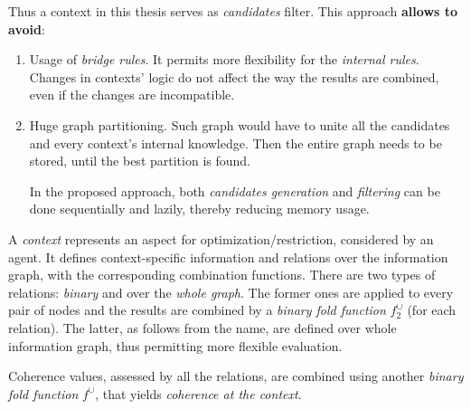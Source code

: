 \documentclass[ThesisDoc]{subfiles}
\begin{document}
Thus a context in this thesis serves as \emph{candidates} filter. This approach
\textbf{allows to avoid}:
\begin{enumerate}
  \item Usage of \emph{bridge rules}. It permits more flexibility for
    the \emph{internal rules}. Changes in contexts' logic do not affect the way
    the results are combined, even if the changes are incompatible.
  \item Huge graph partitioning. Such graph would have to unite all the
    candidates and every context's internal knowledge. Then the entire graph
    needs to be stored, until the best partition is found.

    In the proposed approach, both \emph{candidates generation} and
    \emph{filtering} can be done sequentially and lazily,
    thereby reducing memory usage.

\end{enumerate}

\medskip

\noindent
A \emph{context} represents an aspect for optimization/restriction, considered
by an agent. It defines context-specific information and relations over the
information graph, with the corresponding combination functions. There are
two types of relations: \emph{binary} and over the \emph{whole graph}.
The former ones are applied to every pair of nodes and the results are combined
by a \emph{binary fold function} $f^\cup_2$ (for each relation).
The latter, as follows from the name, are defined over whole information graph,
thus permitting more flexible evaluation.

Coherence values, assessed by all the relations, are combined using another
\emph{binary fold function} $f^\cup$, that yields \emph{coherence at the context}.
\end{document}
